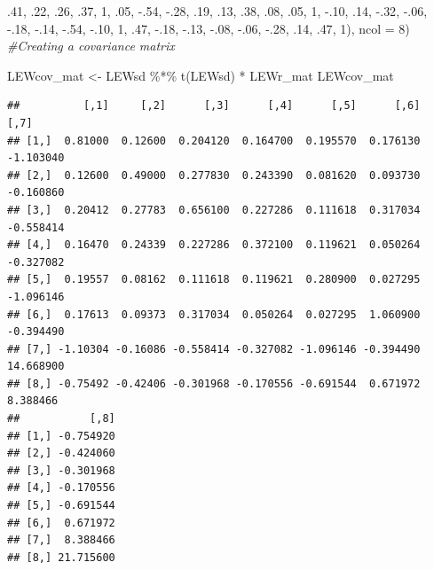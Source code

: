 \documentclass[
  english,
]{book}
\newenvironment{Shaded}{\begin{snugshade}}{\end{snugshade}}
\newcommand{\AttributeTok}[1]{\textcolor[rgb]{0.77,0.63,0.00}{#1}}
\newcommand{\CommentTok}[1]{\textcolor[rgb]{0.56,0.35,0.01}{\textit{#1}}}
\newcommand{\DecValTok}[1]{\textcolor[rgb]{0.00,0.00,0.81}{#1}}
\newcommand{\FunctionTok}[1]{\textcolor[rgb]{0.00,0.00,0.00}{#1}}
\newcommand{\NormalTok}[1]{#1}
\newcommand{\OtherTok}[1]{\textcolor[rgb]{0.56,0.35,0.01}{#1}}
\newcommand{\SpecialCharTok}[1]{\textcolor[rgb]{0.00,0.00,0.00}{#1}}
\begin{document}
\begin{Shaded}
\begin{Highlighting}[]
\NormalTok{        .}\DecValTok{41}\NormalTok{, .}\DecValTok{22}\NormalTok{, .}\DecValTok{26}\NormalTok{, .}\DecValTok{37}\NormalTok{, }\DecValTok{1}\NormalTok{, .}\DecValTok{05}\NormalTok{, }\SpecialCharTok{{-}}\NormalTok{.}\DecValTok{54}\NormalTok{, }\SpecialCharTok{{-}}\NormalTok{.}\DecValTok{28}\NormalTok{, }
\NormalTok{        .}\DecValTok{19}\NormalTok{, .}\DecValTok{13}\NormalTok{, .}\DecValTok{38}\NormalTok{, .}\DecValTok{08}\NormalTok{, .}\DecValTok{05}\NormalTok{, }\DecValTok{1}\NormalTok{, }\SpecialCharTok{{-}}\NormalTok{.}\DecValTok{10}\NormalTok{, .}\DecValTok{14}\NormalTok{, }
        \SpecialCharTok{{-}}\NormalTok{.}\DecValTok{32}\NormalTok{, }\SpecialCharTok{{-}}\NormalTok{.}\DecValTok{06}\NormalTok{, }\SpecialCharTok{{-}}\NormalTok{.}\DecValTok{18}\NormalTok{, }\SpecialCharTok{{-}}\NormalTok{.}\DecValTok{14}\NormalTok{, }\SpecialCharTok{{-}}\NormalTok{.}\DecValTok{54}\NormalTok{, }\SpecialCharTok{{-}}\NormalTok{.}\DecValTok{10}\NormalTok{, }\DecValTok{1}\NormalTok{, .}\DecValTok{47}\NormalTok{,}
        \SpecialCharTok{{-}}\NormalTok{.}\DecValTok{18}\NormalTok{, }\SpecialCharTok{{-}}\NormalTok{.}\DecValTok{13}\NormalTok{, }\SpecialCharTok{{-}}\NormalTok{.}\DecValTok{08}\NormalTok{, }\SpecialCharTok{{-}}\NormalTok{.}\DecValTok{06}\NormalTok{, }\SpecialCharTok{{-}}\NormalTok{.}\DecValTok{28}\NormalTok{, .}\DecValTok{14}\NormalTok{, .}\DecValTok{47}\NormalTok{, }\DecValTok{1}\NormalTok{), }\AttributeTok{ncol =} \DecValTok{8}\NormalTok{)}
\CommentTok{\#Creating a covariance matrix}

\NormalTok{LEWcov\_mat }\OtherTok{\textless{}{-}}\NormalTok{ LEWsd }\SpecialCharTok{\%*\%} \FunctionTok{t}\NormalTok{(LEWsd) }\SpecialCharTok{*}\NormalTok{ LEWr\_mat}
\NormalTok{LEWcov\_mat}
\end{Highlighting}
\end{Shaded}

\begin{verbatim}
##          [,1]     [,2]      [,3]      [,4]      [,5]      [,6]      [,7]
## [1,]  0.81000  0.12600  0.204120  0.164700  0.195570  0.176130 -1.103040
## [2,]  0.12600  0.49000  0.277830  0.243390  0.081620  0.093730 -0.160860
## [3,]  0.20412  0.27783  0.656100  0.227286  0.111618  0.317034 -0.558414
## [4,]  0.16470  0.24339  0.227286  0.372100  0.119621  0.050264 -0.327082
## [5,]  0.19557  0.08162  0.111618  0.119621  0.280900  0.027295 -1.096146
## [6,]  0.17613  0.09373  0.317034  0.050264  0.027295  1.060900 -0.394490
## [7,] -1.10304 -0.16086 -0.558414 -0.327082 -1.096146 -0.394490 14.668900
## [8,] -0.75492 -0.42406 -0.301968 -0.170556 -0.691544  0.671972  8.388466
##           [,8]
## [1,] -0.754920
## [2,] -0.424060
## [3,] -0.301968
## [4,] -0.170556
## [5,] -0.691544
## [6,]  0.671972
## [7,]  8.388466
## [8,] 21.715600
\end{verbatim}
\end{document}
